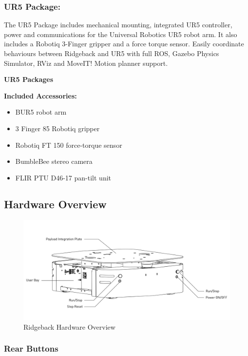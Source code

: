 \documentclass[]{clearpath-latex/clearpath-manual}
\begin{document}
\subsubsection{UR5 Package:}

The UR5 Package includes mechanical mounting, integrated UR5 controller, power and communications for the Universal Robotics UR5 robot arm. It also includes a Robotiq 3-Finger gripper and a force torque sensor. Easily coordinate behaviours between Ridgeback and UR5 with full ROS, Gazebo Physics Simulator, RViz and MoveIT! Motion planner support.

\textbf{UR5 Packages}

\textbf{Included Accessories:}

\begin{itemize}[nolistsep]
	\item BUR5 robot arm
	\item 3 Finger 85 Robotiq gripper
	\item Robotiq FT 150 force-torque sensor
	\item BumbleBee stereo camera
	\item FLIR PTU D46-17 pan-tilt unit
\end{itemize}

\subsection{Hardware Overview}

\begin{figure}[h]
  \centering
  \includegraphics[width=1\linewidth]{Ridgeback_Rear_Drawing_Labeled.pdf}
  \caption{Ridgeback Hardware Overview}
  \label{ridgeback_overview}
\end{figure}

\subsubsection{Rear Buttons}
\end{document}
